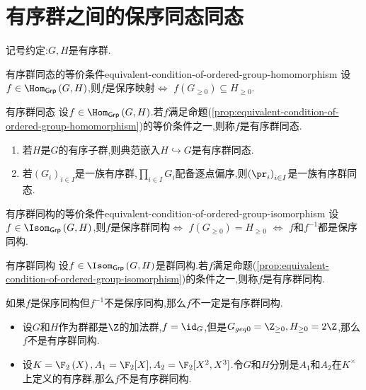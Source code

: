 \section{有序群之间的保序同态同态}

记号约定:$G,H$是有序群.

\begin{proposition}{有序群同态的等价条件}{equivalent-condition-of-ordered-group-homomorphism}
	设$f\in\Hom_{\mathsf{Grp}}\left(G,H\right)$,则$f$是保序映射$\iff$ $f\left(G_{\geqslant 0}\right)\subseteq H_{\geqslant 0}$.
\end{proposition}

\begin{definition}{有序群同态}{}
	设$f\in\Hom_{\mathsf{Grp}}\left(G,H\right)$.若$f$满足命题(\cref{prop:equivalent-condition-of-ordered-group-homomorphism})的等价条件之一,则称$f$是有序群同态.
\end{definition}

\begin{remark}{}{}
	\begin{enumerate}
		\item 若$H$是$G$的有序子群,则典范嵌入$H\hookrightarrow G$是有序群同态.
		\item 若$\left(G_{i}\right)_{i\in I}$是一族有序群,$\prod\limits_{i\in I}G_{i}$配备逐点偏序,则$\left(\pr_{i}\right)_{i\in I}$是一族有序群同态.
	\end{enumerate}
\end{remark}

\begin{proposition}{有序群同构的等价条件}{equivalent-condition-of-ordered-group-isomorphism}
	设$f\in\Isom_{\mathsf{Grp}}\left(G,H\right)$,则$f$是保序群同构$\iff$ $f\left(G_{\geq 0}\right)=H_{\geq 0}$ $\iff$ $f$和$f^{-1}$都是保序同构.
\end{proposition}

\begin{definition}{有序群同构}{}
	设$f\in\Isom_{\mathsf{Grp}}\left(G,H\right)$是群同构.若$f$满足命题(\cref{prop:equivalent-condition-of-ordered-group-isomorphism})的条件之一,则称$f$是有序群同构.
\end{definition}

\begin{remark}{}{}
	如果$f$是保序同构但$f^{-1}$不是保序同构,那么$f$不一定是有序群同构.
	\begin{itemize}
		\item 设$G$和$H$作为群都是$\Z$的加法群,$f=\id_{G}$,但是$G_{geq 0}=\Z_{\geq 0},H_{\geq 0}=2\Z$,那么$f$不是有序群同构.
		\item 设$K=\F_{2}\left(X\right),A_{1}=\F_{2}[X],A_{2}=\F_{2}[X^{2},X^{3}]$.令$G$和$H$分别是$A_{1}$和$A_{2}$在$K^{\times}$上定义的有序群,那么$f$不是有序群同构.
	\end{itemize}
\end{remark}
